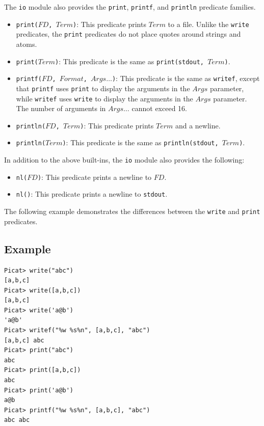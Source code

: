 The \texttt{io} module also provides the \texttt{print}, \texttt{printf}, and \texttt{println} predicate families.
\begin{itemize}
\item \texttt{print($FD$, $Term$)}: This predicate prints $Term$ to a file.  Unlike the \texttt{write} predicates, the \texttt{print} predicates do not place quotes around strings and atoms. 
\item \texttt{print($Term$)}: This predicate is the same as \texttt{print(stdout, $Term$)}.
\item \texttt{printf($FD$, $Format$, $Args\ldots$)}: This predicate is the same as \texttt{writef}, except that \texttt{printf} uses \texttt{print} to display the arguments in the $Args$ parameter, while \texttt{writef} uses \texttt{write} to display the arguments in the $Args$ parameter. The number of arguments in $Args\ldots$ cannot exceed 16.
\item \texttt{println($FD$, $Term$)}: This predicate prints $Term$ and a newline.
\item \texttt{println($Term$)}: This predicate is the same as \texttt{println(stdout, $Term$)}.
\end{itemize}

In addition to the above built-ins, the \texttt{io} module also provides the following:
\begin{itemize}
   \item \texttt{nl($FD$)}: This predicate prints a newline to $FD$.
   \item \texttt{nl()}: This predicate prints a newline to \texttt{stdout}.
\end{itemize}

The following example demonstrates the differences between the \texttt{write} and \texttt{print} predicates.  
\subsection*{Example}
\begin{verbatim}
Picat> write("abc")
[a,b,c]
Picat> write([a,b,c])
[a,b,c]
Picat> write('a@b')
'a@b'
Picat> writef("%w %s%n", [a,b,c], "abc")
[a,b,c] abc
Picat> print("abc")
abc
Picat> print([a,b,c])
abc
Picat> print('a@b')
a@b
Picat> printf("%w %s%n", [a,b,c], "abc")
abc abc
\end{verbatim}

